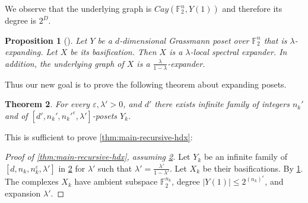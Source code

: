 \documentclass[10pt,a4paper]{article}
\newcommand{\prettyref}[1]{\cref{#1}}
\newtheorem{theorem}{Theorem}[section]
\newtheorem{proposition}[theorem]{Proposition}
\theoremstyle{definition}
\newtheorem{definition}[theorem]{Definition}
\theoremstyle{remark}
\newcommand{\Authornotecolored}[3]{{\sffamily\small\color{#1}{[#2: #3]}}}
\newcommand{\Authornotecolored}[3]{}
\newcommand{\Ynote}{\Authornotecolored{Purple}{Y}}
\newcommand\sett[2]{\left\{ #1 \left| \; \vphantom{#1 #2} \right. #2  \right\}}
\newcommand{\set}[1]{\{#1\}}
\def\sp{\mathrm{ span}}
\renewcommand{\leq}{\leqslant}
\numberwithin{equation}{section}
\let\pref=\prettyref
\def\S{X}
\def\Y{Y}
\def\diml{d}
\def\dimlout{\diml'}
\def\lambdao{\lambda'}
\def\dimm{\ell}
\def\degree{D}
\begin{document}
%
%
%
     We observe that the underlying graph is \(Cay(\mathbb{F}_2^n,Y(1))\) and therefore its degree is \(2^\degree\).
\begin{proposition}[\cite{Golowich2023}] \label{prop:basification}
    Let \(\Y\) be a \(\diml\)-dimensional Grassmann poset over \(\mathbb{F}_2^n\) that is \(\lambda\)-expanding. Let \(\S\) be its basification. Then \(\S\) is a \(\lambda\)-local spectral expander. In addition, the underlying graph of \(X\) is a \(\frac{\lambda}{1-\lambda}\)-expander.
\end{proposition}
%
Thus our new goal is to prove the following theorem about expanding posets.
\begin{theorem} \label{thm:main-recursive-Grassmann}
    For every \(\varepsilon, \lambdao >0\), and \(\dimlout\) there exists infinite family of integers \(n_k'\) and of \([\dimlout,n_k',n_k'^\varepsilon,\lambdao]\)-posets \(\Y_k\).
\end{theorem}
This is sufficient to prove \pref{thm:main-recursive-hdx}:
\begin{proof}[Proof of \pref{thm:main-recursive-hdx}, assuming \pref{thm:main-recursive-Grassmann}]
    Let \(\Y_k\) be an infinite family of \([\diml,n_k,n_k^\varepsilon,\lambda']\) in \pref{thm:main-recursive-Grassmann} for \(\lambda'\) such that \(\lambdao = \frac{\lambda'}{1-\lambda'}\). Let \(\S_k\) be their basifications. By \pref{prop:basification}. The complexes \(\S_k\) have ambient subspace \(\mathbb{F}_2^{n_k}\), degree \(|\Y(1)| \leq 2^{(n_k)^\varepsilon}\), and expansion \(\lambdao\).
\end{proof}
\end{document}
